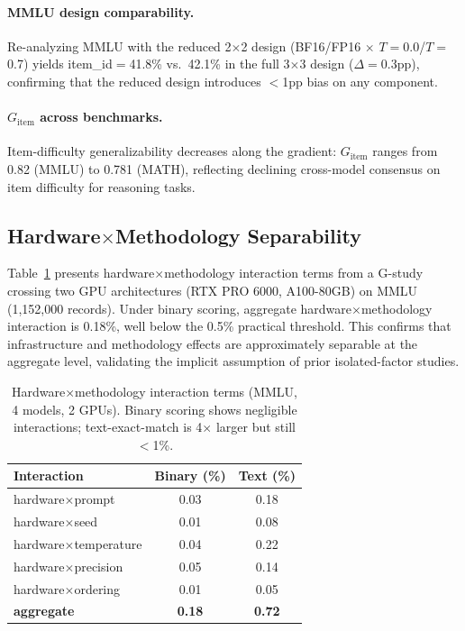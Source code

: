 \documentclass[11pt,a4paper]{article}
\newcommand{\Gcoeff}{\ensuremath{G}}
\begin{document}
\paragraph{MMLU design comparability.}
Re-analyzing MMLU with the reduced 2$\times$2 design (BF16/FP16 $\times$ $T{=}$0.0/$T{=}$0.7) yields item\_id$=$41.8\% vs.\ 42.1\% in the full 3$\times$3 design ($\Delta=$0.3pp), confirming that the reduced design introduces $<$1pp bias on any component.

\paragraph{$\Gcoeff_\text{item}$ across benchmarks.}
Item-difficulty generalizability decreases along the gradient: $\Gcoeff_\text{item}$ ranges from 0.82 (MMLU) to 0.781 (MATH), reflecting declining cross-model consensus on item difficulty for reasoning tasks.

\subsection{Hardware$\times$Methodology Separability}
\label{sec:hardware}

Table~\ref{tab:hardware} presents hardware$\times$methodology interaction terms from a G-study crossing two GPU architectures (RTX PRO 6000, A100-80GB) on MMLU (1,152,000 records).
Under binary scoring, aggregate hardware$\times$methodology interaction is 0.18\%, well below the 0.5\% practical threshold.
This confirms that infrastructure and methodology effects are approximately separable at the aggregate level, validating the implicit assumption of prior isolated-factor studies.

\begin{table}[t]
\centering
\caption{Hardware$\times$methodology interaction terms (MMLU, 4 models, 2 GPUs). Binary scoring shows negligible interactions; text-exact-match is 4$\times$ larger but still $<$1\%.}
\label{tab:hardware}
\small
\begin{tabular}{lcc}
\toprule
\textbf{Interaction} & \textbf{Binary (\%)} & \textbf{Text (\%)} \\
\midrule
hardware$\times$prompt      & 0.03 & 0.18 \\
hardware$\times$seed        & 0.01 & 0.08 \\
hardware$\times$temperature & 0.04 & 0.22 \\
hardware$\times$precision   & 0.05 & 0.14 \\
hardware$\times$ordering    & 0.01 & 0.05 \\
\midrule
\textbf{aggregate}          & \textbf{0.18} & \textbf{0.72} \\
\bottomrule
\end{tabular}
\end{table}
\end{document}

